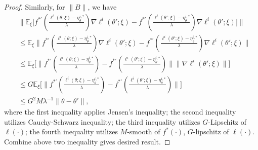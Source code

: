 \documentclass[twoside]{article} %
\theoremstyle{plain}
\theoremstyle{definition}
\theoremstyle{remark}
\begin{document}
\begin{proof}
Similarly, for $\|B\|$, we have
\begin{align}
    &\|\mathbb{E}_{\xi}\Big[f^{*'}(\frac{\ell^i({\theta};\xi)-\eta_{{\theta}}^{i,*}}{\lambda})\nabla \ell^i({\theta}';\xi) - f^{*'}(\frac{\ell^i({\theta}';\xi)-\eta_{{\theta}}^{i,*}}{\lambda})\nabla \ell^i({\theta}';\xi) \Big] \| \nonumber\\
    &\leq \mathbb{E}_{\xi}\|f^{*'}(\frac{\ell^i({\theta};\xi)-\eta_{{\theta}}^{i,*}}{\lambda})\nabla \ell^i({\theta}';\xi) - f^{*'}(\frac{\ell^i({\theta}';\xi)-\eta_{{\theta}}^{i,*}}{\lambda})\nabla \ell^i({\theta}';\xi) \| \nonumber \\
    &\leq \mathbb{E}_{\xi}\Big[\|f^{*'}(\frac{\ell^i({\theta};\xi)-\eta_{{\theta}}^{i,*}}{\lambda}) -f^{*'}(\frac{\ell^i({\theta}';\xi)-\eta_{{\theta}}^{i,*}}{\lambda}) \|\|\nabla \ell^i({\theta}';\xi) \|\Big] \nonumber\\
    &\leq G\mathbb{E}_{\xi}\Big[ \|f^{*'}(\frac{\ell^i({\theta};\xi)-\eta_{{\theta}}^{i,*}}{\lambda}) -f^{*'}(\frac{\ell^i({\theta}';\xi)-\eta_{{\theta}}^{i,*}}{\lambda}) \|\Big] \nonumber\\
    &\leq G^2M\lambda^{-1}\|{\theta}-{\theta}' \|,
\end{align}
where the first inequality applies Jensen's inequality; the second inequality utilizes Cauchy-Schwarz inequality; the third inequality utilizes $G$-Lipschitz of $\ell(\cdot)$; the {fourth} inequality utilizes $M$-smooth of $f^*(\cdot)$, $G$-lipschitz of $\ell(\cdot)$. Combine above two inequality gives desired result.
\end{proof}

\end{document}
